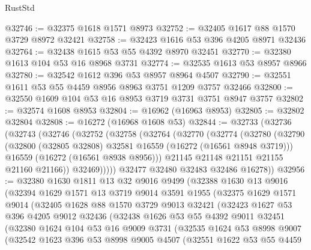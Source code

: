 \begin{lexlean}{RustStd}
\begin{coremodule}
@32746 := @32375 @1618 @1571 @8973
@32752 := @32405 @1617 @88 @1570 @3729 @8972 @32421
@32758 := @32423 @1616 @53 @396 @4205 @8971 @32436
@32764 := @32438 @1615 @53 @55 @4392 @8970 @32451
@32770 := @32380 @1613 @104 @53 @16 @8968 @3731
@32774 := @32535 @1613 @53 @8957 @8966
@32780 := @32542 @1612 @396 @53 @8957 @8964 @4507
@32790 := @32551 @1611 @53 @55 @4459 @8956 @8963 @3751 @1209 @3757 @32466
@32800 := @32550 @1609 @104 @53 @16 @8953 @3719 @3731 @3751 @8947 @3757
@32802 := @32574 @1608 @8953
@32804 := @16962 (@16963 @8953)
@32805 := @32802 @32804
@32808 := @16272 (@16968 @1608 @53)
@32844 := @32733
    (@32736
      (@32743
        (@32746
          (@32752
            (@32758
              (@32764
                (@32770
                  (@32774
                    (@32780
                      (@32790
                        (@32800 (@32805 @32808) @32581 @16559 (@16272 (@16561 @8948 @3719)))
                        @16559
                        (@16272 (@16561 @8938 @8956)))
                      @21145
                      @21148
                      @21151
                      @21155
                      @21160
                      @21166))
                  @32469)))))
        @32477
        @32480
        @32483
        @32486
        @16278))
@32956 := @32380
    @1630
    @1811
    @13
    @32
    @9016
    @9499
    (@32388
      @1630
      @13
      @9016
      (@32394
        @1629
        @1571
        @13
        @3719
        @9014
        @3591
        @1955
        (@32375
          @1629
          @1571
          @9014
          (@32405
            @1628
            @88
            @1570
            @3729
            @9013
            @32421
            (@32423
              @1627
              @53
              @396
              @4205
              @9012
              @32436
              (@32438
                @1626
                @53
                @55
                @4392
                @9011
                @32451
                (@32380
                  @1624
                  @104
                  @53
                  @16
                  @9009
                  @3731
                  (@32535
                    @1624
                    @53
                    @8998
                    @9007
                    (@32542
                      @1623
                      @396
                      @53
                      @8998
                      @9005
                      @4507
                      (@32551
                        @1622
                        @53
                        @55
                        @4459

\end{coremodule}
\end{lexlean}
